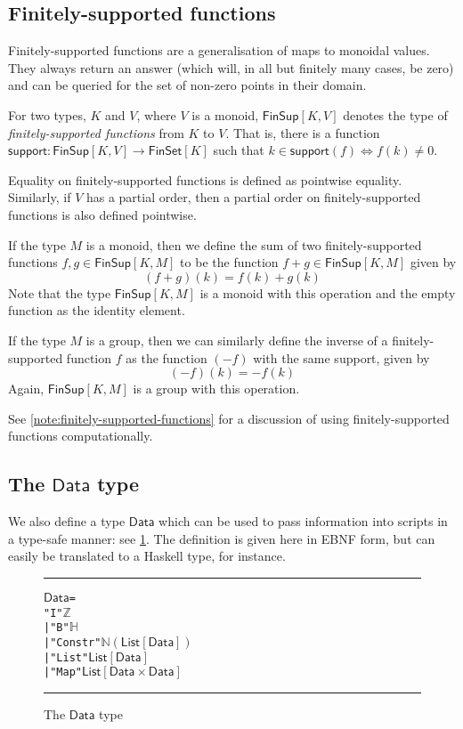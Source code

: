 \documentclass[a4paper]{article}
\newcounter{note}
\newcommand{\s}{\textsf}  %
\newcommand{\msf}[1]{\ensuremath{\mathsf{#1}}}
\newcommand\rfskip{7pt}
\newenvironment{ruledfigure}[1]{\begin{figure}[#1]\hrule\vspace{\rfskip}}{\vspace{\rfskip}\hrule\end{figure}}
\newcommand{\List}[1]{\ensuremath{\s{List}[#1]}}
\newcommand{\FinSet}[1]{\ensuremath{\s{FinSet}[#1]}}
\newcommand{\FinSup}[2]{\ensuremath{\s{FinSup}[#1,#2]}}
\newcommand{\support}{\msf{support}}
\newcommand{\Data}{\ensuremath{\s{Data}}}
\newcommand\N{\ensuremath{\mathbb{N}}}
\newcommand\Z{\ensuremath{\mathbb{Z}}}
\renewcommand\H{\ensuremath{\mathbb{H}}}
\begin{document}
\subsection {Finitely-supported functions}
\label{sec:fsfs}

Finitely-supported functions are a generalisation of maps to monoidal values.
They always return an answer (which will, in all but finitely many cases, be
zero) and can be queried for the set of non-zero points in their domain.

For two types, $K$ and $V$, where $V$ is a monoid, $\FinSup{K}{V}$ denotes the type of
\textit{finitely-supported functions} from $K$ to $V$. That is, there is a
function $\support : \FinSup{K}{V} \rightarrow \FinSet{K}$ such that
$k \in \support(f) \Leftrightarrow f(k) \neq 0$.

Equality on finitely-supported functions is defined as pointwise equality. Similarly,
if $V$ has a partial order, then a partial order on finitely-supported functions
is also defined pointwise.

If the type $M$ is a monoid, then we define the sum of two finitely-supported
functions
$f, g \in \FinSup{K}{M}$ to be the function $f+g \in \FinSup{K}{M}$ given by
\[(f+g)(k) = f(k) + g(k) \]
Note that the type $\FinSup{K}{M}$ is a monoid with this
operation and the empty function as the
identity element.

If the type $M$ is a group, then we can
similarly define the inverse of a finitely-supported function $f$ as
the function $(-f)$ with the same support, given by
\[ (-f)(k) = -f(k) \]
Again, $\FinSup{K}{M}$ is a group with this operation.

\smallskip

See \cref{note:finitely-supported-functions} for a discussion of using
finitely-supported functions computationally.

\subsection{The \Data{} type}
We also define a type \Data{} which can be used to pass information
into scripts in a type-safe manner: see \cref{fig:data-defn}. The
definition is given here in EBNF form, but can easily be translated to
a Haskell type, for instance.

\begin{ruledfigure}{H}
\begin{alltt}
  \Data =
      "I" \(\Z\)
    | "B" \(\H\)
    | "Constr" \(\N (\List{\Data})\)
    | "List" \(\List{\Data}\)
    | "Map" \(\List{\Data\times\Data}\)
\end{alltt}
\caption{The \Data{} type}
\label{fig:data-defn}
\end{ruledfigure}
\end{document}
